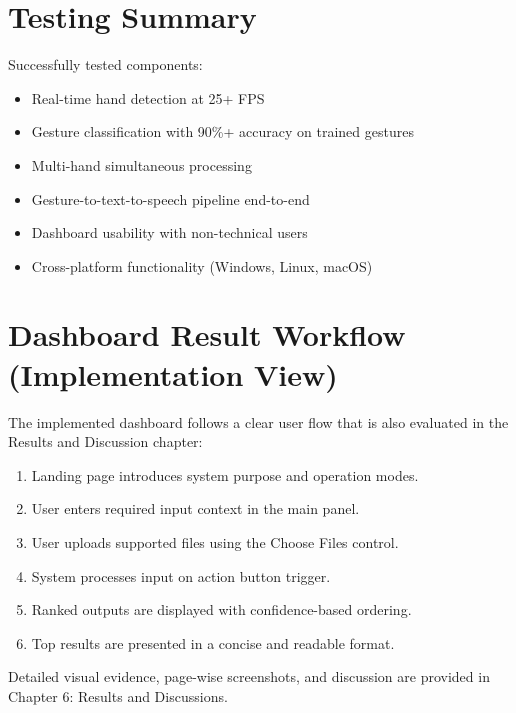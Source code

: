 \section{Testing Summary}

Successfully tested components:
\begin{itemize}
    \item Real-time hand detection at 25+ FPS
    \item Gesture classification with 90\%+ accuracy on trained gestures
    \item Multi-hand simultaneous processing
    \item Gesture-to-text-to-speech pipeline end-to-end
    \item Dashboard usability with non-technical users
    \item Cross-platform functionality (Windows, Linux, macOS)
\end{itemize}

\section{Dashboard Result Workflow (Implementation View)}

The implemented dashboard follows a clear user flow that is also evaluated in the Results and Discussion chapter:

\begin{enumerate}
    \item Landing page introduces system purpose and operation modes.
    \item User enters required input context in the main panel.
    \item User uploads supported files using the Choose Files control.
    \item System processes input on action button trigger.
    \item Ranked outputs are displayed with confidence-based ordering.
    \item Top results are presented in a concise and readable format.
\end{enumerate}

Detailed visual evidence, page-wise screenshots, and discussion are provided in Chapter 6: Results and Discussions.
